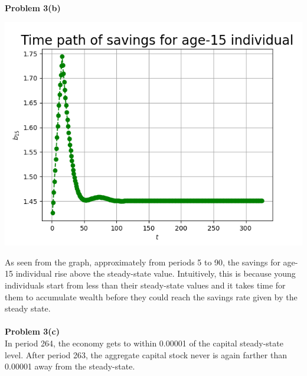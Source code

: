 \documentclass[letterpaper,12pt]{article}
\theoremstyle{definition}
\begin{document}
\\
\noindent\textbf{Problem 3(b)}\\
\begin{center}
\includegraphics[scale=0.7]{bplot}
\end{center}
As seen from the graph, approximately from periods 5 to 90, the savings for age-15 individual rise above the steady-state value. Intuitively, this is because young individuals start from less than their steady-state values and it takes time for them to accumulate wealth before they could reach the savings rate given by the steady state.\\
\\
\noindent\textbf{Problem 3(c)}\\
In period 264, the economy gets to within 0.00001 of the capital steady-state level. After period 263, the aggregate capital stock never is again farther than 0.00001 away from
the steady-state.
\end{document}
